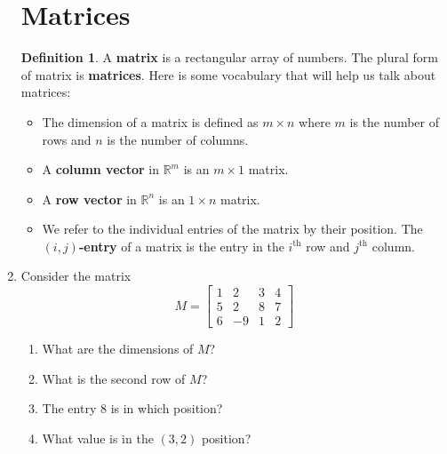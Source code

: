\documentclass[12pt]{amsart}
\theoremstyle{definition}
\newtheorem*{definition}{Definition}
\begin{document}
\begin{enumerate}[itemsep=0.8em,leftmargin=0pt]
\vspace{0.8em}

\section*{Matrices}

\begin{definition}
     A \textbf{matrix} is a rectangular array of numbers. The plural form of matrix is \textbf{matrices}. Here is some vocabulary that will help us talk about matrices:
     \begin{itemize}
         \item The dimension of a matrix is defined as $m\times n$ where $m$ is the number of rows and $n$ is the number of columns.
         \item A \textbf{column vector} in $\mathbb{R}^m$ is an $m\times 1$ matrix.
         \item A \textbf{row vector} in $\mathbb{R}^n$ is an $1\times n$ matrix.
         \item We refer to the individual entries of the matrix by their position. The \textbf{$(i,j)$-entry} of a matrix is the entry in the $i^{\text{th}}$ row and $j^{\text{th}}$ column.
     \end{itemize}
\end{definition}


\item Consider the matrix
$$M=\begin{bmatrix}
    1 & 2 & 3 & 4 \\
    5 & 2 & 8 & 7 \\
    6 & -9 & 1 & 2
\end{bmatrix}$$
\begin{enumerate}
    \item What are the dimensions of $M$?
    \item What is the second row of $M$?
    \item The entry $8$ is in which position?
    \item What value is in the $(3,2)$ position?
\end{enumerate}

\vspace{0.8em}


\end{enumerate}
\end{document}
